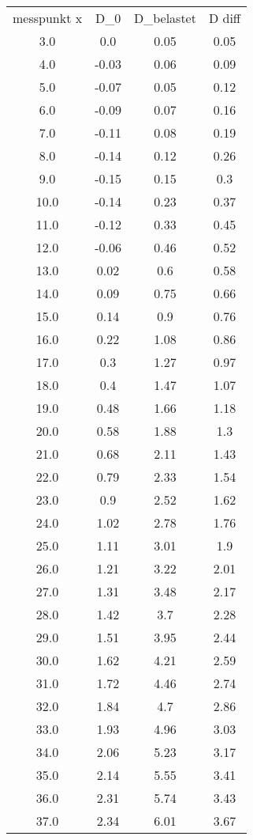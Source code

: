 \begin{table}
\begin{tabular}{cccc}
messpunkt x & D_0 & D_belastet & D diff \\
3.0 & 0.0 & 0.05 & 0.05 \\
4.0 & -0.03 & 0.06 & 0.09 \\
5.0 & -0.07 & 0.05 & 0.12 \\
6.0 & -0.09 & 0.07 & 0.16 \\
7.0 & -0.11 & 0.08 & 0.19 \\
8.0 & -0.14 & 0.12 & 0.26 \\
9.0 & -0.15 & 0.15 & 0.3 \\
10.0 & -0.14 & 0.23 & 0.37 \\
11.0 & -0.12 & 0.33 & 0.45 \\
12.0 & -0.06 & 0.46 & 0.52 \\
13.0 & 0.02 & 0.6 & 0.58 \\
14.0 & 0.09 & 0.75 & 0.66 \\
15.0 & 0.14 & 0.9 & 0.76 \\
16.0 & 0.22 & 1.08 & 0.86 \\
17.0 & 0.3 & 1.27 & 0.97 \\
18.0 & 0.4 & 1.47 & 1.07 \\
19.0 & 0.48 & 1.66 & 1.18 \\
20.0 & 0.58 & 1.88 & 1.3 \\
21.0 & 0.68 & 2.11 & 1.43 \\
22.0 & 0.79 & 2.33 & 1.54 \\
23.0 & 0.9 & 2.52 & 1.62 \\
24.0 & 1.02 & 2.78 & 1.76 \\
25.0 & 1.11 & 3.01 & 1.9 \\
26.0 & 1.21 & 3.22 & 2.01 \\
27.0 & 1.31 & 3.48 & 2.17 \\
28.0 & 1.42 & 3.7 & 2.28 \\
29.0 & 1.51 & 3.95 & 2.44 \\
30.0 & 1.62 & 4.21 & 2.59 \\
31.0 & 1.72 & 4.46 & 2.74 \\
32.0 & 1.84 & 4.7 & 2.86 \\
33.0 & 1.93 & 4.96 & 3.03 \\
34.0 & 2.06 & 5.23 & 3.17 \\
35.0 & 2.14 & 5.55 & 3.41 \\
36.0 & 2.31 & 5.74 & 3.43 \\
37.0 & 2.34 & 6.01 & 3.67 \\

\end{tabular}
\end{table}

